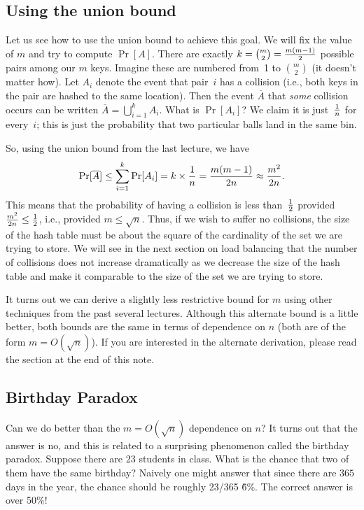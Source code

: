 \documentclass[11pt]{article}
\def\half{{\textstyle{1\over 2}}}
\begin{document}
\subsection*{Using the union bound}
Let us see how to use the union bound to achieve this goal. We will
 fix the value of $m$ and try to compute $\Pr[A]$. 
There are exactly $k={m\choose 2}={{m(m-1)}\over 2}$ possible pairs
among our $m$ keys.  Imagine these are numbered from~1 to ${m\choose 2}$
(it doesn't matter how).  Let $A_i$ denote the event that pair~$i$
has a collision (i.e., both keys in the pair are hashed to the same location).  Then
the event $\overline A$ that {\it some\/} collision
occurs can be written $\overline{A}=\bigcup_{i=1}^k A_i$.  What is
$\Pr[A_i]$?  We claim it is just~$1\over n$ for every~$i$; this is
just the probability that two particular balls land in the same bin.

So, using the union bound from the last lecture, we have $$
   \Pr[\overline{A}] \le \sum_{i=1}^k\Pr[A_i] = k\times{1\over n} = 
                          {{m(m-1)}\over{2n}}\approx{{m^2}\over{2n}}.  $$
This means that the probability of having a collision is less than~$\half$
provided $\frac{m^2}{2n}\le\half$, i.e., provided $m\le\sqrt{n}$. Thus, if 
we wish to suffer no collisions, the size of the hash table must be about the 
square of the cardinality of the set we are trying to store. We will see in 
the next section on load balancing that the number of collisions does not
increase dramatically as we decrease the size of the hash table and make it
comparable to the size of the set we are trying to store. 

It turns out we can derive a slightly less restrictive bound for $m$ using other techniques
from the past several lectures. Although this alternate bound is a little better,
both bounds are the same in terms of dependence on $n$ (both
are of the form $m = O(\sqrt{n})$). If you are interested in the alternate derivation,
please read the section at the end of this note. 


\subsection*{Birthday Paradox}

Can we do better than the $m = O(\sqrt{n})$ dependence on $n$? It turns out that the answer is 
no, and this is related to a surprising phenomenon called the birthday paradox. Suppose there
are $23$ students in class. What is the chance that two of them have the same birthday? 
Naively one might answer that since there are $365$ days in the year, the chance should be
roughly 23/365 \~ 6\%. The correct answer is over 50\%!
\end{document}
